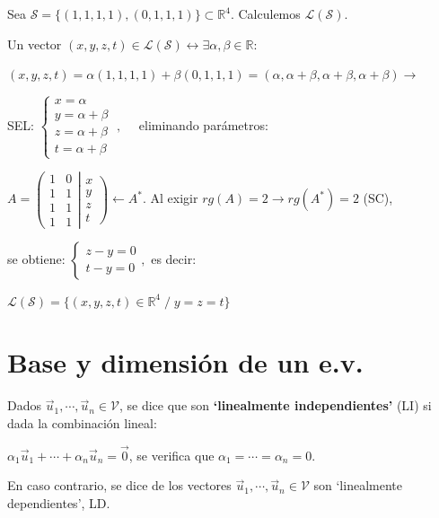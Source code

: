 \begin{ejem}
Sea $\mathcal S=\{(1,1,1,1),(0,1,1,1)\} \subset \mathbb R^4$. Calculemos $\mathcal {L(S)}.$	

\noindent Un vector $(x,y,z,t) \in \mathcal {L(S)} \leftrightarrow \exists \alpha, \beta \in \mathbb R : \; $

\noindent $(x,y,z,t)= \alpha (1,1,1,1) + \beta (0,1,1,1)= (\alpha, \alpha+\beta, \alpha+\beta, \alpha+\beta) \to $

\noindent SEL: $\begin{cases} x=\alpha \\ y= \alpha+\beta \\ z= \alpha+\beta \\ t= \alpha+\beta \end{cases}\; , \quad $ eliminando parámetros:

\noindent $ A=\left (\begin{matrix} \boxed{1}&\boxed{0}\\\boxed{1}&\boxed{1}\\1&1\\1&1 \end{matrix} \right| 
\left. \begin{matrix} x\\y\\z\\t  \end{matrix} \right) \leftarrow A^*$. Al exigir $rg(A)=2 \to rg(A^*)=2$ (SC),

\noindent se obtiene: $\begin{cases} z-y=0\\t-y=0  \end{cases}, $ es decir:

\noindent $\mathcal {L(S)}= \{ (x,y,z,t)\in \mathbb R^4 \; / \; y=z=t \}$
	

\end{ejem}

\section{Base y dimensión de un e.v.}

\begin{defi}
Dados $\vec u_1, \cdots, \vec u_n \in \mathcal V$, se dice que son \textbf{`linealmente independientes'} (LI)	si dada la combinación lineal:

$\alpha_1 \vec u_1 + \cdots + \alpha_n \vec u_n=\vec 0$, se verifica que $\alpha_1= \cdots =\alpha_n=0$. 

En caso contrario, se dice de los vectores $\vec u_1, \cdots, \vec u_n \in \mathcal V$ son `linealmente dependientes', LD.  
\end{defi}

